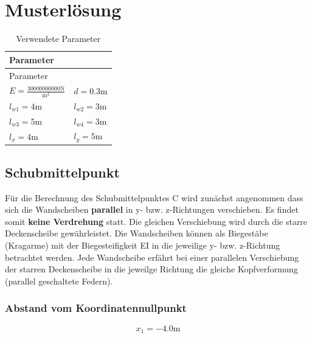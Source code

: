 \documentclass[
  letterpaper,
  DIV=11]{scrreprt}
\begin{document}
\newpage{}

\hypertarget{musterluxf6sung-14}{%
\section{Musterlösung}\label{musterluxf6sung-14}}

\hypertarget{tbl-parameter_ekv1}{}
\begin{longtable}[]{@{}ll@{}}
\caption{\label{tbl-parameter_ekv1}Verwendete Parameter}\tabularnewline
\toprule\noalign{}
Parameter & \\
\midrule\noalign{}
\endfirsthead
\toprule\noalign{}
Parameter & \\
\midrule\noalign{}
\endhead
\bottomrule\noalign{}
\endlastfoot
\(E = \frac{30000000000 \text{N}}{\text{m}^{2}}\) &
\(d = 0.3 \text{m}\) \\
\(l_{w1} = 4 \text{m}\) & \(l_{w2} = 3 \text{m}\) \\
\(l_{w3} = 5 \text{m}\) & \(l_{w4} = 3 \text{m}\) \\
\(l_{x} = 4 \text{m}\) & \(l_{y} = 5 \text{m}\) \\
\end{longtable}

\hypertarget{schubmittelpunkt}{%
\subsection{Schubmittelpunkt}\label{schubmittelpunkt}}

Für die Berechnung des Schubmittelpunktes C wird zunächst angenommen
dass sich die Wandscheiben \textbf{parallel} in y- bzw. z-Richtungen
verschieben. Es findet somit \textbf{keine Verdrehung} statt. Die
gleichen Verschiebung wird durch die starre Deckenscheibe gewährleistet.
Die Wandscheiben können als Biegestäbe (Kragarme) mit der
Biegesteifigkeit EI in die jeweilige y- bzw. z-Richtung betrachtet
werden. Jede Wandscheibe erfährt bei einer parallelen Verschiebung der
starren Deckenscheibe in die jeweilge Richtung die gleiche
Kopfverformung (parallel geschaltete Federn).

\hypertarget{abstand-vom-koordinatennullpunkt}{%
\subsubsection{Abstand vom
Koordinatennullpunkt}\label{abstand-vom-koordinatennullpunkt}}

\begin{equation*}x_{1} = - 4.0 \text{m}\end{equation*}
\end{document}

